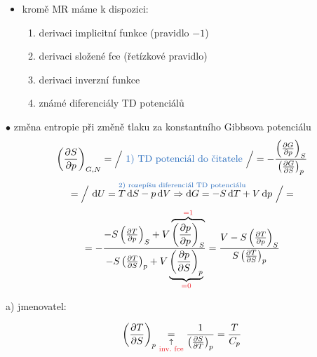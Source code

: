 \begin{itemize}
  \item kromě MR máme k dispozici:
  \begin{enumerate}[label=\arabic*)]
    \item derivaci implicitní funkce (pravidlo $-1$)
    \item derivaci složené fce (řetízkové pravidlo)
    \item derivaci inverzní funkce
    \item známé diferenciály TD potenciálů
  \end{enumerate}
\end{itemize}

\begin{priklad}
$\bullet$ změna entropie při změně tlaku za konstantního Gibbsova potenciálu \\
\[
  \left(\pdv{S}{p}\right)_{G,N} = \Big/\ \text{\modre{1) TD potenciál do čitatele}}\ \Big/
  = -\frac{\left(\pdv{G}{p}\right)_S}{\left(\pdv{G}{S}\right)_p}
\]
\[
  = \Big/\ \overset{\text{\modre{2) rozepíšu diferenciál TD potenciálu}}}{\dd U = T\,\dd S - p\,\dd V \Rightarrow \dd G = -S\,\dd T + V\,\dd p}\ \Big/ =
\]
\[
  = -\frac{-S\left(\pdv{T}{p}\right)_S + V\overbrace{\left(\pdv{p}{p}\right)_S}^{\cervene{=1}}}
          {-S\left(\pdv{T}{S}\right)_p + V\underbrace{\left(\pdv{p}{S}\right)_p}_{\cervene{=0}}}
  = \frac{V - S\left(\pdv{T}{p}\right)_S}{S\left(\pdv{T}{S}\right)_p}
\]
\hfill {}

a) jmenovatel: \quad
\begin{minipage}[t]{0.75\textwidth}
\end{minipage}
\[
  \left(\pdv{T}{S}\right)_p \underset{\substack{\uparrow\\ \cervene{\text{inv.\ fce}}}}{=} \frac{1}{\left(\pdv{S}{T}\right)_p} = \frac{T}{C_p}
\]
\end{priklad}

